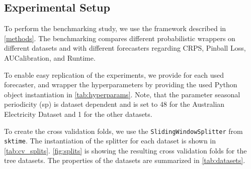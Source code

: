 \subsection{Experimental Setup}
To perform the benchmarking study, we use the framework described in \autoref{methods}. The benchmarking compares different probabilistic wrappers on different datasets and with different forecasters regarding CRPS, Pinball Loss, AUCalibration, and Runtime.

To enable easy replication of the experiments, we provide for each used forecaster, and wrapper the hyperparameters by providing the used Python object instantiation in \autoref{tab:hyperparams}. Note, that the parameter seasonal periodicity (sp) is dataset dependent and is set to 48 for the Australian Electricity Dataset and 1 for the other datasets.

To create the cross validation folds, we use the \texttt{SlidingWindowSplitter} from \texttt{sktime}. The instantiation of the splitter for each dataset is shown in \autoref{tab:cv_splits}. \autoref{fig:splits} is showing the resulting cross validation folds for the tree datasets. The properties of the datasets are summarized in \autoref{tab:datasets}.



